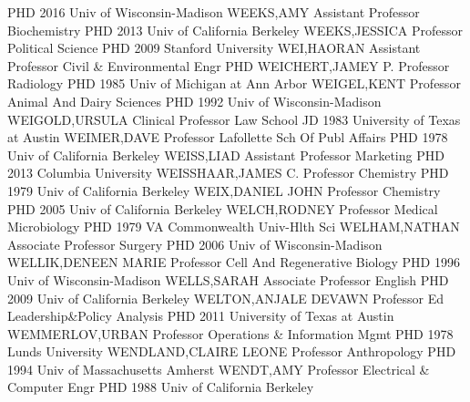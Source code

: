 \documentclass[
]{article}
\begin{document}
\textbar PHD 2016 Univ of Wisconsin-Madison \textbar{} 
\textbar WEEKS,AMY \textbar Assistant Professor \textbar Biochemistry
\textbar PHD 2013 Univ of California Berkeley \textbar{} 
\textbar WEEKS,JESSICA \textbar Professor \textbar Political Science
\textbar PHD 2009 Stanford University \textbar{} 
\textbar WEI,HAORAN \textbar Assistant Professor \textbar Civil \&
Environmental Engr \textbar PHD \textbar{} 
\textbar WEICHERT,JAMEY P. \textbar Professor \textbar Radiology
\textbar PHD 1985 Univ of Michigan at Ann Arbor \textbar{} 
\textbar WEIGEL,KENT \textbar Professor \textbar Animal And Dairy
Sciences \textbar PHD 1992 Univ of Wisconsin-Madison \textbar{}
 \textbar WEIGOLD,URSULA \textbar Clinical Professor
\textbar Law School \textbar JD 1983 University of Texas at Austin
\textbar{}  \textbar WEIMER,DAVE \textbar Professor
\textbar Lafollette Sch Of Publ Affairs \textbar PHD 1978 Univ of
California Berkeley \textbar{}  \textbar WEISS,LIAD
\textbar Assistant Professor \textbar Marketing \textbar PHD 2013
Columbia University \textbar{}  \textbar WEISSHAAR,JAMES C.
\textbar Professor \textbar Chemistry \textbar PHD 1979 Univ of
California Berkeley \textbar{}  \textbar WEIX,DANIEL JOHN
\textbar Professor \textbar Chemistry \textbar PHD 2005 Univ of
California Berkeley \textbar{}  \textbar WELCH,RODNEY
\textbar Professor \textbar Medical Microbiology \textbar PHD 1979 VA
Commonwealth Univ-Hlth Sci \textbar{} 
\textbar WELHAM,NATHAN \textbar Associate Professor \textbar Surgery
\textbar PHD 2006 Univ of Wisconsin-Madison \textbar{} 
\textbar WELLIK,DENEEN MARIE \textbar Professor \textbar Cell And
Regenerative Biology \textbar PHD 1996 Univ of Wisconsin-Madison
\textbar{}  \textbar WELLS,SARAH \textbar Associate
Professor \textbar English \textbar PHD 2009 Univ of California Berkeley
\textbar{}  \textbar WELTON,ANJALE DEVAWN \textbar Professor
\textbar Ed Leadership\&Policy Analysis \textbar PHD 2011 University of
Texas at Austin \textbar{}  \textbar WEMMERLOV,URBAN
\textbar Professor \textbar Operations \& Information Mgmt \textbar PHD
1978 Lunds University \textbar{}  \textbar WENDLAND,CLAIRE
LEONE \textbar Professor \textbar Anthropology \textbar PHD 1994 Univ of
Massachusetts Amherst \textbar{}  \textbar WENDT,AMY
\textbar Professor \textbar Electrical \& Computer Engr \textbar PHD
1988 Univ of California Berkeley \textbar{} 
\end{document}
